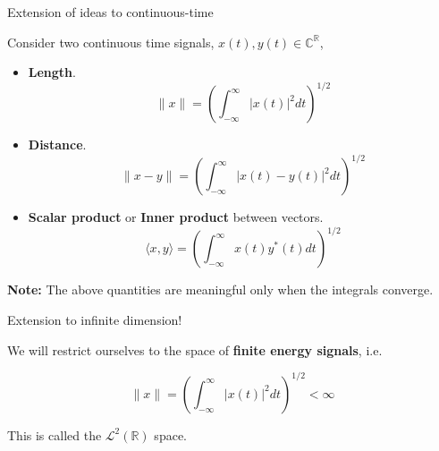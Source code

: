 \documentclass{beamer}
\begin{document}
\begin{frame}{Extension of ideas to continuous-time}

Consider two continuous time signals, $x\left(t\right), y\left(t\right) \in \mathbb{C}^{\mathbb{R}}$, 
\begin{itemize}
\item \textbf{Length}.
\[ \|x\| = \left(\int_{-\infty}^{\infty}{\left|x(t)\right|^2dt}\right)^{1/2} \]
\item \textbf{Distance}.
\[ \|x - y\| = \left(\int_{-\infty}^{\infty}{\left|x(t) - y(t)\right|^2dt}\right)^{1/2} \]
\item \textbf{Scalar product} or \textbf{Inner product} between vectors.
\[ \langle x, y \rangle = \left(\int_{-\infty}^{\infty}{x(t)y^*(t)dt}\right)^{1/2} \]
\end{itemize}

\textbf{Note:} The above quantities are meaningful only when the integrals converge.
\end{frame}

\begin{frame}{Extension to infinite dimension!}

We will restrict ourselves to the space of \textbf{finite energy signals}, i.e.

\[ \|x\| = \left(\int_{-\infty}^{\infty}{\left|x(t)\right|^2dt}\right)^{1/2} < \infty \]

This is called the $\mathcal{L}^2\left(\mathbb{R}\right)$ space.

\end{frame}
\end{document}
